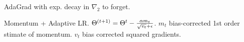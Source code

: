 \begin{definition}[RMSprop]
    AdaGrad with exp. decay in \(\nabla_2\) to forget. 
\end{definition}

\begin{definition}[Adam]
    Momentum + Adaptive LR. \(\Theta^{(t+1)} = \Theta^t - \frac{\alpha m_t}{\sqrt{v_t} + \epsilon}\). \(m_t\) bias-corrected 1st order stimate of momentum. \(v_t\) bias corrected squared gradients.
\end{definition}


